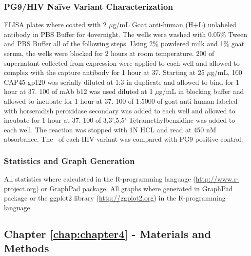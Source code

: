 \subsubsection{PG9/HIV Na\"ive Variant Characterization}
ELISA plates where coated with 2 $\mu$g/mL Goat anti-human (H+L) unlabeled antibody in PBS Buffer for 4\degree overnight. The wells were washed with 0.05\% Tween and PBS Buffer all of the following steps. Using 2\% powdered milk and 1\% goat serum, the wells were blocked for 2 hours at room temperature. 200 \microliter of supernatant collected from expression were applied to each well and allowed to complex with the capture antibody for 1 hour at 37\degree. Starting at 25 $\mu$g/mL, 100 \microliter CAP45 gp120 was serially diluted at 1:3 in duplicate and allowed to bind for 1 hour at 37\degree. 100 \microliter of mAb b12 was used diluted at 1 $\mu$g/mL in blocking buffer and allowed to incubate for 1 hour at 37\degree. 100 \microliter of 1:5000 of goat anti-human labeled with horseradish peroxidase secondary was added to each well and allowed to incubate for 1 hour at 37\degree. 100 \microliter of 3,3',5,5'-Tetramethylbenzidine was added to each well. The reaction was stopped with 1N HCL and read at 450 nM absorbance. The \ec~of each HIV-\naive variant was compared with PG9 positive control.


\subsubsection{Statistics and Graph Generation}
All statistics where calculated in the R-programming language (\url{http://www.r-project.org}) or GraphPad package. All graphs where generated in GraphPad package or the ggplot2 library (\url{http://ggplot2.org}) in the R-programming language.

\clearpage

\subsection{Chapter \ref{chap:chapter4} - Materials and Methods}
\par\vspace{10pt}
